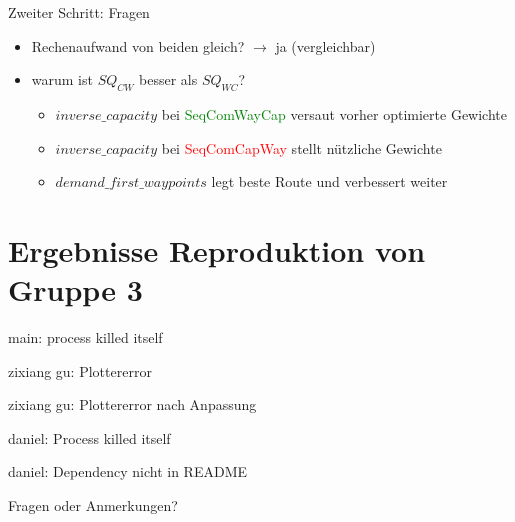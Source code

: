\documentclass[aspectratio=169,10pt]{beamer}
\begin{document}
\begin{frame}{Zweiter Schritt: Fragen}
\Large
\begin{itemize}
    \item Rechenaufwand von beiden gleich? $\rightarrow$ ja (vergleichbar)
    \item warum ist $SQ_{CW}$ besser als $SQ_{WC}$?
    \begin{itemize}
    \Large
        \item $inverse\_capacity$ bei \textcolor{green}{SeqComWayCap} versaut vorher optimierte Gewichte
        \item $inverse\_capacity$ bei \textcolor{red}{SeqComCapWay} stellt n\"utzliche Gewichte
        \item $demand\_first\_waypoints$ legt beste Route und verbessert weiter
    \end{itemize}
\end{itemize}
\end{frame}

\section{Ergebnisse Reproduktion von Gruppe 3}
\begin{frame}{main: process killed itself}
\begin{center}
\end{center}
\end{frame}
\begin{frame}{zixiang gu: Plottererror}
\begin{center}
\end{center}
\end{frame}
\begin{frame}{zixiang gu: Plottererror nach Anpassung}
\begin{center}
\end{center}
\end{frame}
\begin{frame}{daniel: Process killed itself}
\begin{center}
\end{center}
\end{frame}
\begin{frame}{daniel: Dependency nicht in README}
\begin{center}
\end{center}
\end{frame}

\begin{frame}[t,standout]
\Large
Fragen oder Anmerkungen?
\end{frame}
\end{document}
